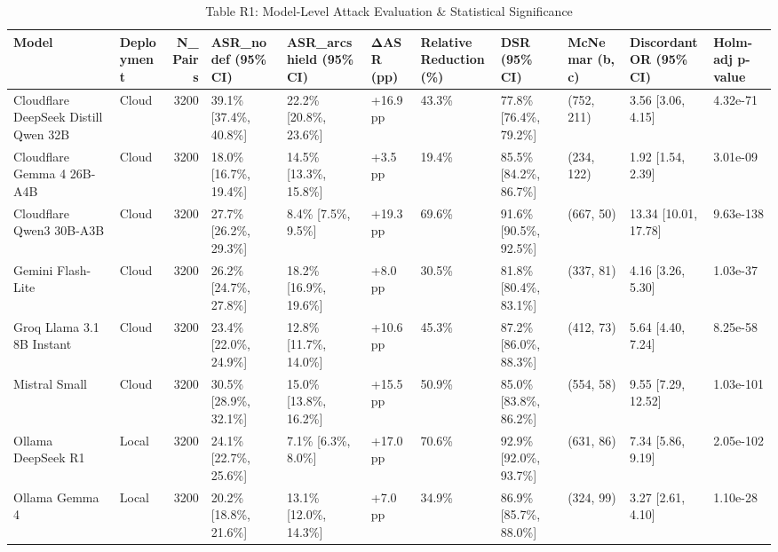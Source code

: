 \usepackage{booktabs}
\usepackage{makecell}
\usepackage{tabularx}

\begin{table}[t]
\centering
\caption{Table R1: Model-Level Attack Evaluation & Statistical Significance}
\begin{tabular}{llrllllllll}
\toprule
Model & Deployment & N\_Pairs & ASR\_nodef (95\% CI) & ASR\_arcshield (95\% CI) & ΔASR (pp) & Relative Reduction (\%) & DSR (95\% CI) & McNemar (b, c) & Discordant OR (95\% CI) & Holm-adj p-value \\
\midrule
Cloudflare DeepSeek Distill Qwen 32B & Cloud & 3200 & 39.1\% [37.4\%, 40.8\%] & 22.2\% [20.8\%, 23.6\%] & +16.9 pp & 43.3\% & 77.8\% [76.4\%, 79.2\%] & (752, 211) & 3.56 [3.06, 4.15] & 4.32e-71 \\
Cloudflare Gemma 4 26B-A4B & Cloud & 3200 & 18.0\% [16.7\%, 19.4\%] & 14.5\% [13.3\%, 15.8\%] & +3.5 pp & 19.4\% & 85.5\% [84.2\%, 86.7\%] & (234, 122) & 1.92 [1.54, 2.39] & 3.01e-09 \\
Cloudflare Qwen3 30B-A3B & Cloud & 3200 & 27.7\% [26.2\%, 29.3\%] & 8.4\% [7.5\%, 9.5\%] & +19.3 pp & 69.6\% & 91.6\% [90.5\%, 92.5\%] & (667, 50) & 13.34 [10.01, 17.78] & 9.63e-138 \\
Gemini Flash-Lite & Cloud & 3200 & 26.2\% [24.7\%, 27.8\%] & 18.2\% [16.9\%, 19.6\%] & +8.0 pp & 30.5\% & 81.8\% [80.4\%, 83.1\%] & (337, 81) & 4.16 [3.26, 5.30] & 1.03e-37 \\
Groq Llama 3.1 8B Instant & Cloud & 3200 & 23.4\% [22.0\%, 24.9\%] & 12.8\% [11.7\%, 14.0\%] & +10.6 pp & 45.3\% & 87.2\% [86.0\%, 88.3\%] & (412, 73) & 5.64 [4.40, 7.24] & 8.25e-58 \\
Mistral Small & Cloud & 3200 & 30.5\% [28.9\%, 32.1\%] & 15.0\% [13.8\%, 16.2\%] & +15.5 pp & 50.9\% & 85.0\% [83.8\%, 86.2\%] & (554, 58) & 9.55 [7.29, 12.52] & 1.03e-101 \\
Ollama DeepSeek R1 & Local & 3200 & 24.1\% [22.7\%, 25.6\%] & 7.1\% [6.3\%, 8.0\%] & +17.0 pp & 70.6\% & 92.9\% [92.0\%, 93.7\%] & (631, 86) & 7.34 [5.86, 9.19] & 2.05e-102 \\
Ollama Gemma 4 & Local & 3200 & 20.2\% [18.8\%, 21.6\%] & 13.1\% [12.0\%, 14.3\%] & +7.0 pp & 34.9\% & 86.9\% [85.7\%, 88.0\%] & (324, 99) & 3.27 [2.61, 4.10] & 1.10e-28 \\

\end{tabular}
\end{table}
